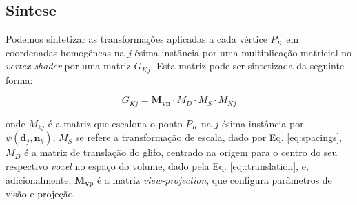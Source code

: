 \subsection{Síntese}

Podemos sintetizar as transformações aplicadas a cada vértice $P_K$ em coordenadas homogêneas na $j$-ésima instância por uma multiplicação matricial no \textit{vertex shader} por uma matriz $G_{Kj}$. Esta matriz pode ser sintetizada da seguinte forma:

\begin{equation}
    G_{Kj} = \mathbf{M_{vp}}\cdot M_D \cdot M_S \cdot M_{Kj}
\end{equation}

onde $M_{kj}$ é a matriz que escalona o ponto $P_K$ na $j$-ésima instância por $\psi(\mathbf{d}_j, \mathbf{n}_k)$, $M_S$ se refere a transformação de escala, dado por Eq. \ref{eq:spacings}, $M_D$ é a matriz de translação do glifo, centrado na origem para o centro do seu respectivo \textit{voxel} no espaço do volume, dado pela Eq. \ref{eq::translation}, e, adicionalmente, $\mathbf{M_{vp}}$ é a matriz \textit{view-projection}, que configura parâmetros de visão e projeção.

